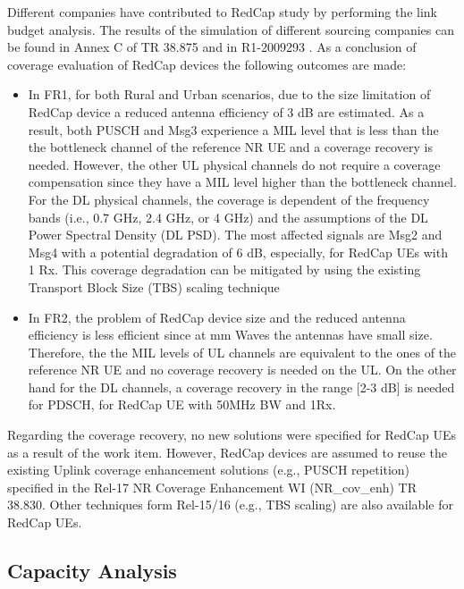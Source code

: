 \documentclass[conference]{IEEEtran}
\begin{document}
Different companies have contributed to RedCap study by performing the link budget analysis. The results of the simulation of different sourcing companies can be found in Annex C of TR 38.875 \cite{3gpp.38.875} and in R1-2009293 \cite{3gpp.R1-2009293}. As a conclusion of coverage evaluation of RedCap devices the following outcomes are made:
\begin{itemize}
    \item In FR1, for both Rural and Urban scenarios, due to the size limitation of RedCap device a reduced antenna efficiency of 3 dB are estimated. As a result, both PUSCH and Msg3 experience a MIL level that is less than the the bottleneck channel of the reference NR UE and a coverage recovery is needed. However, the other UL physical channels do not require a coverage compensation since they have a MIL level higher than the bottleneck channel. For the DL physical channels, the coverage is dependent of the frequency bands (i.e., 0.7 GHz, 2.4 GHz, or 4 GHz) and the assumptions of the DL Power Spectral Density (DL PSD). The most affected signals are Msg2 and Msg4 with a potential degradation of 6 dB, especially, for RedCap UEs with 1 Rx. This coverage degradation can be mitigated by using the existing  Transport Block Size (TBS) scaling technique
    \item In FR2, the problem of RedCap device size and the reduced antenna efficiency is less efficient since at mm Waves the antennas have small size.  Therefore, the the MIL levels of UL channels are equivalent to the ones of the reference NR UE and no coverage recovery is needed on the UL. On the other hand for the DL channels, a coverage recovery in the range [2-3 dB] is needed for PDSCH, for RedCap UE with 50MHz BW and 1Rx.
\end{itemize}


Regarding the coverage recovery, no new solutions were specified for RedCap UEs as a result of the work item.  However, RedCap devices are assumed to reuse the existing Uplink coverage enhancement solutions (e.g., PUSCH repetition)  specified in the Rel-17 NR Coverage Enhancement WI (NR\_cov\_enh) TR 38.830\cite{3gpp_study_nodate-3_38.830}. Other techniques form Rel-15/16 (e.g., TBS scaling) are also available for RedCap UEs.






\subsection{Capacity Analysis}
\label{sec:6-2}
\end{document}
